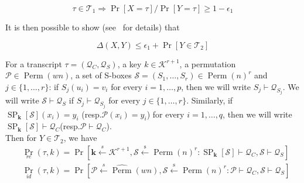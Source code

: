 $$
\tau \in \mathcal{T}_{1} \Longrightarrow \operatorname{Pr}[X=\tau] / \operatorname{Pr}[Y=\tau] \geq 1-\epsilon_{1}
$$

It is then possible to show (see~\cite{EC:CheSte14} for details) that

$$
\Delta(X, Y) \leq \epsilon_{1}+\operatorname{Pr}\left[Y \in \mathcal{T}_{2}\right]
$$

For a transcript $\tau=\left(\mathcal{Q}_{C}, \mathcal{Q}_{S}\right)$, a key $k \in \mathcal{K}^{r+1}$, a permutation $\mathcal{P} \in \operatorname{Perm}( w n)$, a set of S-boxes $\mathcal{S} =\left(S_{1}, \ldots, S_{r}\right) \in \operatorname{Perm}( n)^{r}$ and $j \in \{1, \ldots, r\}$: if $S_{j}(u_{i})=v_{i}$ for every $i=1, \ldots, p$, then we will write $S_{j} \vdash \mathcal{Q}_{S_{j}}$. We will write $\mathcal{S} \vdash \mathcal{Q}_{S}$ if $S_{j} \vdash \mathcal{Q}_{S_{j}}$ for every $j \in \{1, \ldots, r\}$. Similarly, if $\operatorname{SP}_{\mathbf{k}}[\mathcal{S}]\left(x_{i}\right)=y_{i}$ (resp.$\mathcal{P}\left(x_{i}\right)=y_{i}$) for every $i=1, \ldots, q$, then we will write $\operatorname{SP}_{\mathbf{k}}[\mathcal{S}] \vdash \mathcal{Q}_{C}$(resp.$\mathcal{P} \vdash \mathcal{Q}_{C}$).\\

Then for $Y \in \mathcal{T}_{2}$, we have
$$
\begin{aligned}
&\operatorname{Pr}_{r e}(\tau, k) = \operatorname{Pr}\left[\mathbf{k} \stackrel{s}{\leftarrow} \mathcal{K}^{r+1}, \mathcal{S} \stackrel{\mathrm{s}}{\leftarrow} \operatorname{Perm}(n)^{r}: \operatorname{SP}_{\mathbf{k}}[\mathcal{S}] \vdash \mathcal{Q}_{C}, \mathcal{S} \vdash \mathcal{Q}_{S}\right]\\
&\operatorname{Pr}_{i d}(\tau, k) = \operatorname{Pr}\left[\mathcal{P} \stackrel{s}{\leftarrow} \widehat{\operatorname{Perm}}(w n), \mathcal{S} \stackrel{\mathrm{s}}{\leftarrow} \operatorname{Perm}(n)^{r}: \mathcal{P} \vdash \mathcal{Q}_{C}, \mathcal{S} \vdash \mathcal{Q}_{S}\right]\\
\end{aligned}
$$


